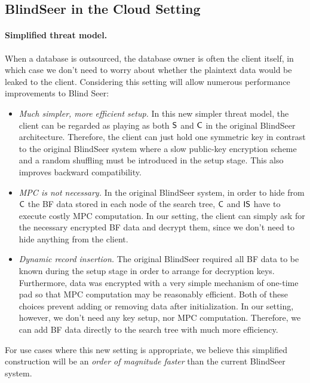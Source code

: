 
\subsection{BlindSeer in the Cloud Setting}
\label{sec:ext-blindseer}
\paragraph{Simplified threat model.}
When a database is outsourced, the database owner is often the client
itself, in which case we don't need to worry about whether the plaintext data
would be leaked to the client. Considering this setting will allow
numerous performance improvements to Blind Seer:

\begin{itemize}\setlength\itemsep{0em}
\item {\em Much simpler, more efficient setup.}
In this new simpler threat model, the client can be regarded as playing as both
$\sf S$ and $\sf C$ in the original BlindSeer architecture. Therefore, the
client can just hold one symmetric key in contrast to the original BlindSeer
system where a slow public-key encryption scheme and a random shuffling
must be introduced in the setup stage.
This also improves backward compatibility.

\item {\em MPC is not necessary.} In the original BlindSeer system, in order to
hide from $\sf C$ the BF data stored in each node of the search tree, $\sf
C$ and $\sf IS$ have to execute costly MPC computation. In our setting, the
    client can simply ask for the necessary encrypted BF data and decrypt them,
    since we don't need to hide anything from the client.  


\item {\em Dynamic record insertion.}
The original BlindSeer required all BF data to be known during the setup
stage in order to arrange for decryption keys.
Furthermore, data was encrypted with a very
simple mechanism of one-time pad so that MPC computation may be reasonably
efficient.
Both of these choices prevent adding or removing data after initialization.
In our setting, however, we don't need any key setup, nor MPC computation.
Therefore, we can add BF data directly to the search tree with much more
efficiency.  
\end{itemize}
%
For use cases where this new setting is appropriate, we
believe this simplified construction will be an {\em order of magnitude faster}
than the current BlindSeer system.

